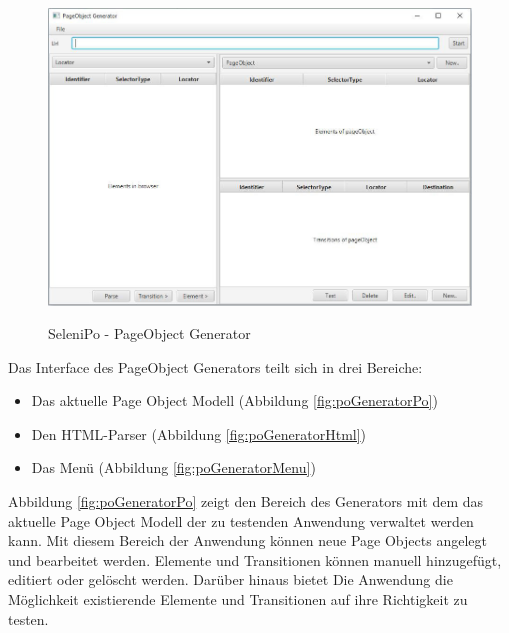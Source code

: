\begin{figure}[htb]
  \centering  
  \includegraphics[scale=0.5]{img/poGenerator.JPG}\\
  \caption{SeleniPo - PageObject Generator}
  \label{fig:poGenerator}
\end{figure}



Das Interface des PageObject Generators teilt sich in drei Bereiche:

\begin{itemize}
	\item Das aktuelle Page Object Modell (Abbildung \ref{fig:poGeneratorPo})
	\item Den HTML-Parser (Abbildung \ref{fig:poGeneratorHtml})
	\item Das Menü (Abbildung \ref{fig:poGeneratorMenu})
\end{itemize}


Abbildung \ref{fig:poGeneratorPo} zeigt den Bereich des Generators mit dem das aktuelle Page Object Modell der zu testenden Anwendung verwaltet werden kann. Mit diesem Bereich der Anwendung können neue Page Objects angelegt und bearbeitet werden. Elemente und Transitionen können manuell hinzugefügt, editiert oder gelöscht werden. Darüber hinaus bietet Die Anwendung die Möglichkeit existierende Elemente und Transitionen auf ihre Richtigkeit zu testen.

